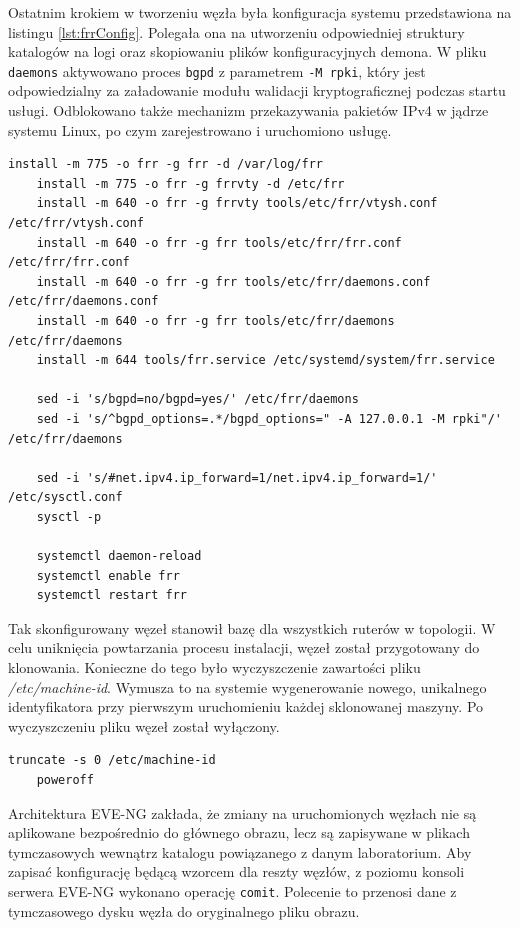 Ostatnim krokiem w tworzeniu węzła była konfiguracja systemu przedstawiona na listingu \ref{lst:frrConfig}. Polegała ona na utworzeniu odpowiedniej struktury katalogów na logi oraz skopiowaniu plików konfiguracyjnych demona. W pliku \texttt{daemons} aktywowano proces \texttt{bgpd} z parametrem \texttt{-M rpki}, który jest odpowiedzialny za załadowanie modułu walidacji kryptograficznej podczas startu usługi. Odblokowano także mechanizm przekazywania pakietów IPv4 w jądrze systemu Linux, po czym zarejestrowano i uruchomiono usługę.
\begin{lstlisting}[caption={Konfiguracja plików oraz usług systemowych}, label={lst:frrConfig}]
	install -m 775 -o frr -g frr -d /var/log/frr
	install -m 775 -o frr -g frrvty -d /etc/frr
	install -m 640 -o frr -g frrvty tools/etc/frr/vtysh.conf /etc/frr/vtysh.conf
	install -m 640 -o frr -g frr tools/etc/frr/frr.conf /etc/frr/frr.conf
	install -m 640 -o frr -g frr tools/etc/frr/daemons.conf /etc/frr/daemons.conf
	install -m 640 -o frr -g frr tools/etc/frr/daemons /etc/frr/daemons
	install -m 644 tools/frr.service /etc/systemd/system/frr.service
	
	sed -i 's/bgpd=no/bgpd=yes/' /etc/frr/daemons
	sed -i 's/^bgpd_options=.*/bgpd_options=" -A 127.0.0.1 -M rpki"/' /etc/frr/daemons
	
	sed -i 's/#net.ipv4.ip_forward=1/net.ipv4.ip_forward=1/' /etc/sysctl.conf
	sysctl -p
	
	systemctl daemon-reload
	systemctl enable frr
	systemctl restart frr
\end{lstlisting}

Tak skonfigurowany węzeł stanowił bazę dla wszystkich ruterów w topologii. W celu uniknięcia powtarzania procesu instalacji, węzeł został przygotowany do klonowania. Konieczne do tego było wyczyszczenie zawartości pliku \textit{/etc/machine-id}. Wymusza to na systemie wygenerowanie nowego, unikalnego identyfikatora przy pierwszym uruchomieniu każdej sklonowanej maszyny. Po wyczyszczeniu pliku węzeł został wyłączony.

\begin{lstlisting}[caption={Przygotowanie systemu do klonowania}, label={lst:sysprep}]
	truncate -s 0 /etc/machine-id
	poweroff
\end{lstlisting}

Architektura EVE-NG zakłada, że zmiany na uruchomionych węzłach nie są aplikowane bezpośrednio do głównego obrazu, lecz są zapisywane w plikach tymczasowych wewnątrz katalogu powiązanego z danym laboratorium. Aby zapisać konfigurację będącą wzorcem dla reszty węzłów, z poziomu konsoli serwera EVE-NG wykonano operację \texttt{comit}. Polecenie to przenosi dane z tymczasowego dysku węzła do oryginalnego pliku obrazu.

